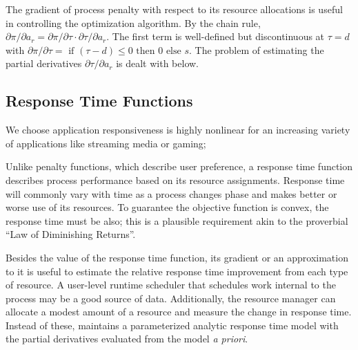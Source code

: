 The gradient of process penalty with respect to its resource allocations is useful in controlling the optimization algorithm.
By the chain rule, $\partial\pi/\partial a_r = \partial\pi/\partial\tau\cdot\partial\tau/\partial a_r$.
The first term is well-defined but discontinuous at $\tau = d$ with
$\partial\pi/\partial\tau = \mbox{ if } (\tau - d) \leq 0 \mbox{ then } 0 \mbox{ else } s$.
The problem of estimating the partial derivatives $\partial\tau/\partial a_r$ is dealt with below.


\subsection*{Response Time Functions}

We choose application responsiveness is highly nonlinear for an increasing variety of applications like streaming media or gaming; 

Unlike penalty functions, which describe user preference, a response time function describes process performance based on its resource assignments.
Response time will commonly vary with time as a process changes phase and makes better or worse use of its resources.
To guarantee the objective function is convex, the response time must be also;
this is a plausible requirement akin to the proverbial ``Law of Diminishing Returns''.

Besides the value of the response time function, its gradient or an approximation to it is useful to estimate the relative response time improvement from each type of resource.  A user-level runtime scheduler that schedules work internal to the process may be a good source of data.
Additionally, the resource manager can allocate a modest amount of a resource and measure the change in response time.
Instead of these, \pacora maintains a parameterized analytic response time model with the partial derivatives evaluated from the model \emph{a priori}.

